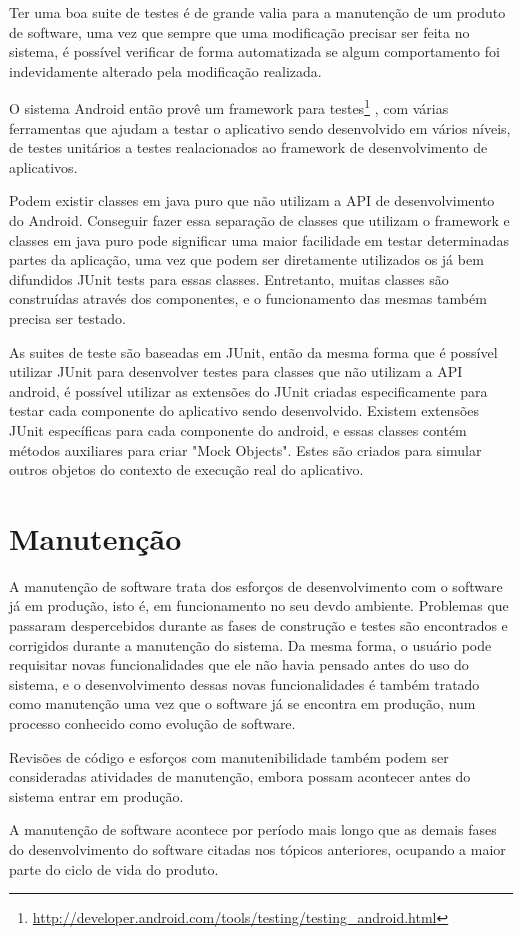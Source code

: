 Ter uma boa suite de testes é de grande valia para a manutenção de um produto de software, uma vez que sempre que uma modificação precisar ser feita no sistema, é possível verificar de forma automatizada se algum comportamento foi indevidamente alterado pela modificação realizada.

O sistema Android então provê um framework para testes\footnote{\url{http://developer.android.com/tools/testing/testing\_android.html}} , com várias ferramentas que ajudam a testar o aplicativo sendo desenvolvido em vários níveis, de testes unitários a testes realacionados ao framework de desenvolvimento de aplicativos. 

Podem existir classes em java puro que não utilizam a API de desenvolvimento do Android. Conseguir fazer essa separação de classes que utilizam o framework e classes em java puro pode significar uma maior facilidade em testar determinadas partes da aplicação, uma vez que podem ser diretamente utilizados os já bem difundidos JUnit tests para essas classes. Entretanto, muitas classes são construídas através dos componentes, e o funcionamento das mesmas também precisa ser testado.

As suites de teste são baseadas em JUnit, então da mesma forma que é possível utilizar JUnit para desenvolver testes para classes que não utilizam a API android, é possível utilizar as extensões do JUnit criadas especificamente para testar cada componente do aplicativo sendo desenvolvido. Existem extensões JUnit específicas para cada componente do android, e essas classes contém métodos auxiliares para criar "Mock Objects". Estes são criados para simular outros objetos do contexto de execução real do aplicativo.


\section{Manutenção}


A manutenção de software trata dos esforços de desenvolvimento com o software já em produção, isto é, em funcionamento no seu devdo ambiente. Problemas que passaram despercebidos durante as fases de construção e testes são encontrados e corrigidos durante a manutenção do sistema. Da mesma forma, o usuário pode requisitar novas funcionalidades que ele não havia pensado antes do uso do sistema, e o desenvolvimento dessas novas funcionalidades é também tratado como manutenção uma vez que o software já se encontra em produção, num processo conhecido como evolução de software. 

Revisões de código e esforços com manutenibilidade também podem ser consideradas atividades de manutenção, embora possam acontecer antes do sistema entrar em produção.

A manutenção de software acontece por período mais longo que as demais fases do desenvolvimento do software citadas nos tópicos anteriores, ocupando a maior parte do ciclo de vida do produto.

